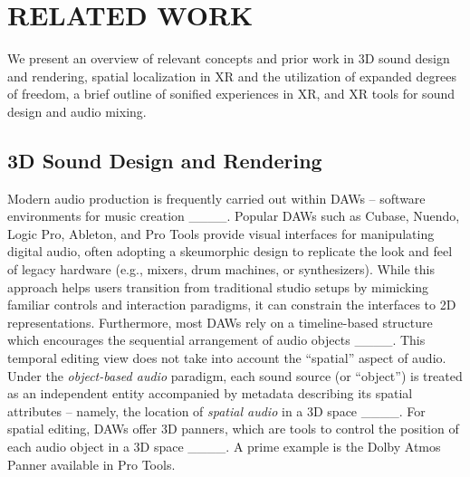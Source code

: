 \section{RELATED WORK}
We present an overview of relevant concepts and prior work in 3D sound design and rendering, spatial localization in XR and the utilization of expanded degrees of freedom, a brief outline of sonified experiences in XR, and XR tools for sound design and audio mixing.

\subsection{3D Sound Design and Rendering}

Modern audio production is frequently carried out within DAWs -- software environments for music creation ____. Popular DAWs such as Cubase, Nuendo, Logic Pro, Ableton, and Pro Tools provide visual interfaces for manipulating %
digital audio, often adopting a skeumorphic design to replicate the look and feel of legacy hardware (e.g., mixers, drum machines, or synthesizers). While this approach helps users transition from traditional studio setups by mimicking familiar controls and interaction paradigms, it can constrain the interfaces to 2D representations. Furthermore, most DAWs rely on a timeline-based structure which encourages the sequential arrangement of audio objects ____. This temporal editing view does not take into account the \enquote{spatial} aspect of audio. Under the \emph{object-based audio} paradigm, each sound source (or \enquote{object}) is treated as an independent entity accompanied by metadata describing its spatial attributes -- namely, the location of \emph{spatial audio} in a 3D space ____. For spatial editing, DAWs offer 3D panners, which are tools to control the position of each audio object in a 3D space ____. A prime example is the Dolby Atmos Panner available in Pro Tools. 

